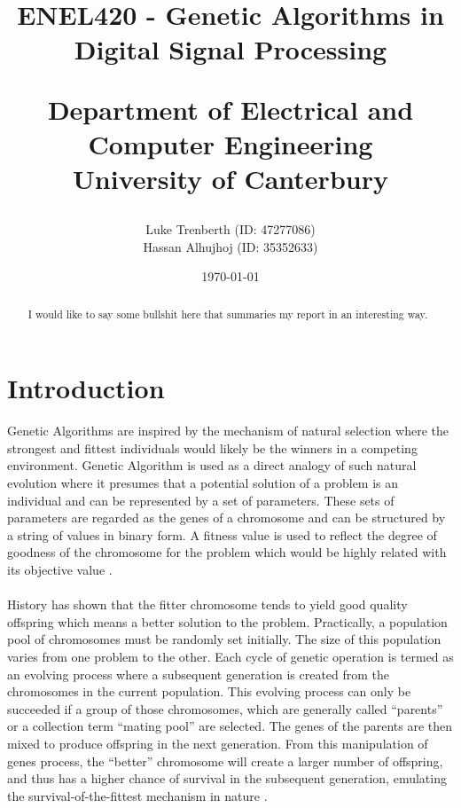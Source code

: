 \documentclass[a4paper, 11pt]{article}
\title{
    ENEL420 - Genetic Algorithms in Digital Signal Processing\\
    \vspace{1cm}
    \begin{large} 
        Department of Electrical and Computer Engineering\\
        University of Canterbury\\
    \end{large}
    \vspace{1cm}
}
\author{
    \small {Luke Trenberth (ID: 47277086)}\\
    \small {Hassan Alhujhoj (ID: 35352633)}\\
    }
\date{\small\today}
\begin{document}
\maketitle

\begin{abstract}
    I would like to say some bullshit here that summaries my report in an interesting way.
\end{abstract}

\pagebreak
{}
\tableofcontents
{}
\pagebreak

\section{Introduction}\label{sec:intro}
    Genetic Algorithms are inspired by the mechanism of natural selection where the strongest and fittest
    individuals would likely be the winners in a competing environment. Genetic Algorithm is used as a direct 
    analogy of such natural evolution where it presumes that a potential solution of a problem is an individual 
    and can be represented by a set of parameters. These sets of parameters are regarded as the genes of a chromosome 
    and can be structured by a string of values in binary form. A fitness value is used to reflect the degree of 
    goodness of the chromosome for the problem which would be highly related with its objective value \cite{Man1997}.
    \\\\
    History has shown that the fitter chromosome tends to yield good quality offspring which means a
    better solution to the problem. Practically, a population pool of chromosomes must be randomly set initially. 
    The size of this population varies from one problem to the other. Each cycle of genetic operation is termed as 
    an evolving process where a subsequent generation is created from the chromosomes in the current population.  
    This evolving process can only be succeeded if a group of those chromosomes, which are generally called
    “parents” or a collection term “mating pool” are selected. The genes of the parents are then mixed to produce 
    offspring in the next generation. From this manipulation of genes process, the “better” chromosome will create a 
    larger number of offspring, and thus has a higher chance of survival in the subsequent generation, emulating the 
    survival-of-the-fittest mechanism in nature \cite{Man1997}.
    \\\\
\end{document}
